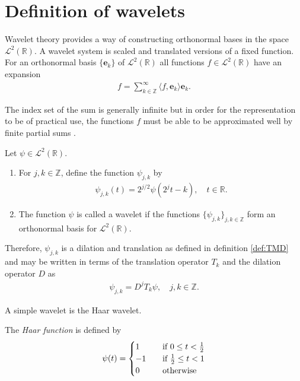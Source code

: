 \section{Definition of wavelets}
Wavelet theory provides a way of constructing orthonormal bases in the space $\mathcal{L}^2(\mathbb{R})$. A wavelet system is scaled and translated versions of a fixed function. For an orthonormal basis $\{\textbf{e}_k\}$ of $\mathcal{L}^2(\mathbb{R})$ all functions $f \in \mathcal{L}^2(\mathbb{R})$ have an expansion
\begin{align*}
f = \sum_{k\in\mathbb{Z}}^\infty \langle f, \textbf{e}_k \rangle \textbf{e}_k.
\end{align*}

The index set of the sum is generally infinite but in order for the representation to be of practical use, the functions $f$ must be able to be approximated well by finite partial sums \cite{page 160, FSE2010}.

\begin{definition}[Wavelet]
Let $\psi \in \mathcal{L}^2(\mathbb{R})$.
\begin{enumerate}
\item For $j,k \in \mathbb{Z}$, define the function $\psi_{j,k}$ by
\begin{align*}
\psi_{j,k}(t) = 2^{j/2} \psi(2^jt-k), \quad t \in \mathbb{R}.
\end{align*}
\item The function $\psi$ is called a wavelet if the functions $\{\psi_{j,k}\}_{j,k\in\mathbb{Z}}$ form an orthonormal basis for $\mathcal{L}^2(\mathbb{R})$.
\end{enumerate}
\end{definition}

Therefore, $\psi_{j,k}$ is a dilation and translation as defined in definition \ref{def:TMD} and may be written in terms of the translation operator $T_k$ and the dilation operator $D$ as \cite{page 160, FSE2010}
\begin{align*}
\psi_{j,k} = D^j T_k \psi, \quad j,k \in \mathbb{Z}.
\end{align*}

A simple wavelet is the Haar wavelet.

\begin{definition} \label{HaarWave}
The \textit{Haar function} is defined by
\begin{align*}
\psi(t) =
\begin{cases}
1 \quad &\textnormal{if } 0 \leq t < \frac{1}{2} \\
-1 \quad &\textnormal{if } \frac{1}{2} \leq t < 1 \\
0 \quad &\textnormal{otherwise}
\end{cases}
\end{align*}
\end{definition}

